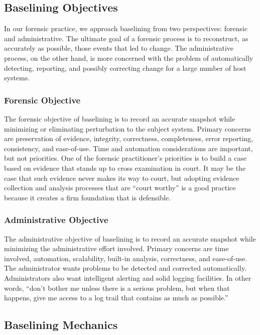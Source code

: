 \documentclass[10pt]{article}
\begin{document}
\subsection{Baselining Objectives}

In our forensic practice, we approach baselining from two perspectives:
forensic and administrative.  The ultimate goal of a forensic
process is to reconstruct, as accurately as possible, those events
that led to change.  The administrative process, on the other hand,
is more concerned with the problem of automatically detecting,
reporting, and possibly correcting change for a large number of
host systems.

\subsubsection{Forensic Objective}

The forensic objective of baselining is to record an accurate
snapshot while minimizing or eliminating perturbation to the subject
system.  Primary concerns are preservation of evidence, integrity,
correctness, completeness, error reporting, consistency, and
ease-of-use.  Time and automation considerations are important,
but not priorities.  One of the forensic practitioner's priorities
is to build a case based on evidence that stands up to cross
examination in court.  It may be the case that such evidence never
makes its way to court, but adopting evidence collection and analysis
processes that are ``court worthy'' is a good practice because it
creates a firm foundation that is defensible.

\subsubsection{Administrative Objective}

The administrative objective of baselining is to record an accurate
snapshot while minimizing the administrative effort involved.
Primary concerns are time involved, automation, scalability, built-in
analysis, correctness, and ease-of-use.  The administrator wants
problems to be detected and corrected automatically.  Administrators
also want intelligent alerting and solid logging facilities.  In
other words, ``don't bother me unless there is a serious problem,
but when that happens, give me access to a log trail that contains
as much as possible.''

\subsection{Baselining Mechanics}
\end{document}
